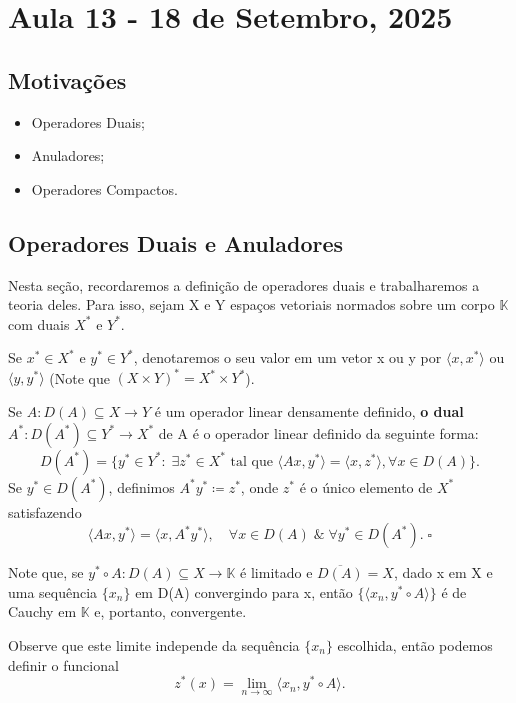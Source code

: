 \documentclass[../functional_analysis.tex]{subfiles}
\begin{document}
\section{Aula 13 - 18 de Setembro, 2025}
\subsection{Motivações}
\begin{itemize}
	\item Operadores Duais;
	\item Anuladores;
	\item Operadores Compactos.
\end{itemize}
\subsection{Operadores Duais e Anuladores}
Nesta seção, recordaremos a definição de operadores duais e trabalharemos a teoria deles.
Para isso, sejam X e Y espaços vetoriais normados sobre um corpo \(\mathbb{K}\) com duais \(X^{*}\) e \(Y^{*}\).

Se \(x^{*}\in X^{*}\) e \(y^{*}\in Y^{*}\), denotaremos o seu valor em um vetor x ou y por \(\langle x, x^{*} \rangle\) ou \(\langle y, y^{*} \rangle\) (Note que \((X\times Y)^{*} = X^{*}\times Y^{*}\)).
\begin{def*}
	Se \(A:D(A)\subseteq X\rightarrow Y\) é um operador linear densamente definido, \textbf{o dual} \(A^{*}:D(A^{*})\subseteq Y^{*}\rightarrow X^{*}\) de A é o operador linear definido da seguinte forma:
	\[
		D(A^{*}) = \{y^{*}\in Y^{*}:\; \exists z^{*}\in X^{*} \text{ tal que } \langle Ax, y^{*} \rangle = \langle x, z^{*} \rangle, \forall x\in D(A)\}.
	\]
	Se \(y^{*}\in D(A^{*})\), definimos \(A^{*}y^{*}\coloneqq z^{*}\), onde \(z^{*}\) é o único elemento de \(X^{*}\) satisfazendo
	\[
		\langle Ax, y^{*} \rangle = \langle x, A^{*}y^{*} \rangle, \quad \forall x\in D(A)\;\&\; \forall y^{*}\in D(A^{*}).\; \square
	\]
\end{def*}

Note que, se \(y^{*}\circ A:D(A)\subseteq X\rightarrow \mathbb{K}\) é limitado e \(\overline{D(A)}=X\), dado x em X e uma sequência
\(\{x_{n}\}\) em D(A) convergindo para x, então \(\{\langle x_{n}, y^{*}\circ A \rangle\}\) é de Cauchy em \(\mathbb{K}\) e, portanto,
convergente.

Observe que este limite independe da sequência \(\{x_{n}\}\) escolhida, então podemos definir o funcional
\[
	z^{*}(x)=\lim_{n\to \infty}\langle x_{n}, y^{*}\circ A \rangle.
\]
\end{document}
